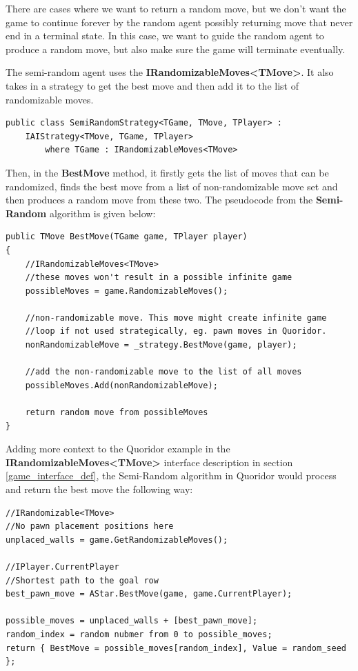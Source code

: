 There are cases where we want to return a random move, but we don't want the game to continue forever by the random agent possibly returning move that never end in a terminal state. In this case, we want to guide the random agent to produce a random move, but also make sure the game will terminate eventually.

The semi-random agent uses the \textbf{IRandomizableMoves\textless{}TMove\textgreater{}}. It also takes in a strategy to get the best move and then add it to the list of randomizable moves.

\begin{lstlisting}
public class SemiRandomStrategy<TGame, TMove, TPlayer> :
    IAIStrategy<TMove, TGame, TPlayer>
        where TGame : IRandomizableMoves<TMove>
\end{lstlisting}

Then, in the \textbf{BestMove} method, it firstly gets the list of moves that can be randomized, finds the best move from a list of non-randomizable move set and then produces a random move from these two. The pseudocode from the \textbf{Semi-Random} algorithm is given below:

\begin{lstlisting}
public TMove BestMove(TGame game, TPlayer player)
{
    //IRandomizableMoves<TMove>
    //these moves won't result in a possible infinite game
    possibleMoves = game.RandomizableMoves();

    //non-randomizable move. This move might create infinite game
    //loop if not used strategically, eg. pawn moves in Quoridor.
    nonRandomizableMove = _strategy.BestMove(game, player);

    //add the non-randomizable move to the list of all moves
    possibleMoves.Add(nonRandomizableMove);

    return random move from possibleMoves
}
\end{lstlisting}

Adding more context to the Quoridor example in the \textbf{IRandomizableMoves\textless{}TMove\textgreater{}} interface description in section \ref{game_interface_def}, the Semi-Random algorithm in Quoridor would process and return the best move the following way:

\begin{lstlisting}
//IRandomizable<TMove>
//No pawn placement positions here
unplaced_walls = game.GetRandomizableMoves();

//IPlayer.CurrentPlayer
//Shortest path to the goal row
best_pawn_move = AStar.BestMove(game, game.CurrentPlayer);

possible_moves = unplaced_walls + [best_pawn_move];
random_index = random nubmer from 0 to possible_moves;
return { BestMove = possible_moves[random_index], Value = random_seed };
\end{lstlisting}

